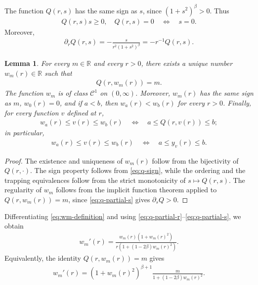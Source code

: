 \documentclass{amsart}
\theoremstyle{plain}
\newtheorem{lemma}[theorem]{Lemma}
\theoremstyle{mainintrothm}
\theoremstyle{definition}
\begin{document}
\medskip

The function $Q(r,s)$ has the same sign as $s$, since
$(1+s^2)^\beta>0$.  Thus
\begin{align}
	\label{eq:q-sign}
	Q(r,s)s\ge0,
	\quad
	Q(r,s)=0\quad\Longleftrightarrow\quad s=0.
\end{align}
Moreover,
\begin{align}
	\label{eq:q-partial-r}
	\partial_rQ(r,s)
	=
	-\frac{s}{r^2(1+s^2)^\beta}
	=
	-r^{-1}Q(r,s).
\end{align}

\begin{lemma}
	\label{lem:level-set-control}
	For every $m\in\mathbb R$ and every $r>0$, there exists a unique number
	$w_m(r)\in\mathbb R$ such that
	\begin{align}
		\label{eq:wm-definition}
		Q(r,w_m(r))=m.
	\end{align}
	The function $w_m$ is of class $\mathcal C^1$ on $(0,\infty)$.  Moreover,
	$w_m(r)$ has the same sign as $m$, $w_0(r)=0$, and if $a<b$, then
	$w_a(r)<w_b(r)$ for every $r>0$.  Finally, for every function $v$ defined at
	$r$,
	\begin{align}
		\label{eq:wm-trapping}
		w_a(r)\le v(r)\le w_b(r)
		\quad\Longleftrightarrow\quad
		a\le Q(r,v(r))\le b;
	\end{align}
	in particular,
	\begin{align}
		\label{eq:eta-trapping}
		w_a(r)\le v(r)\le w_b(r)
		\quad\Longleftrightarrow\quad
		a\le y_v(r)\le b .
	\end{align}
\end{lemma}

\begin{proof}
	The existence and uniqueness of $w_m(r)$ follow from the bijectivity of
	$Q(r,\cdot)$.  The sign property follows from \eqref{eq:q-sign}, while the
	ordering and the trapping equivalences follow from the strict monotonicity of
	$s\mapsto Q(r,s)$. The regularity of $w_m$ follows from the implicit function theorem applied to
	$Q(r,w_m(r))=m$, since \eqref{eq:q-partial-s} gives $\partial_sQ>0$.
\end{proof}

Differentiating \eqref{eq:wm-definition} and using
\eqref{eq:q-partial-r}--\eqref{eq:q-partial-s}, we obtain
\begin{align}
	\label{eq:wm-derivative}
	w_m'(r)
	=
	\frac{w_m(r)(1+w_m(r)^2)}
	{r\left(1+(1-2\beta)w_m(r)^2\right)}.
\end{align}
Equivalently, the identity $Q(r,w_m(r))=m$ gives
\begin{align}
	\label{eq:wm-derivative-level}
	w_m'(r)
	=
	(1+w_m(r)^2)^{\beta+1}
	\frac{m}{1+(1-2\beta)w_m(r)^2}.
\end{align}
\end{document}
